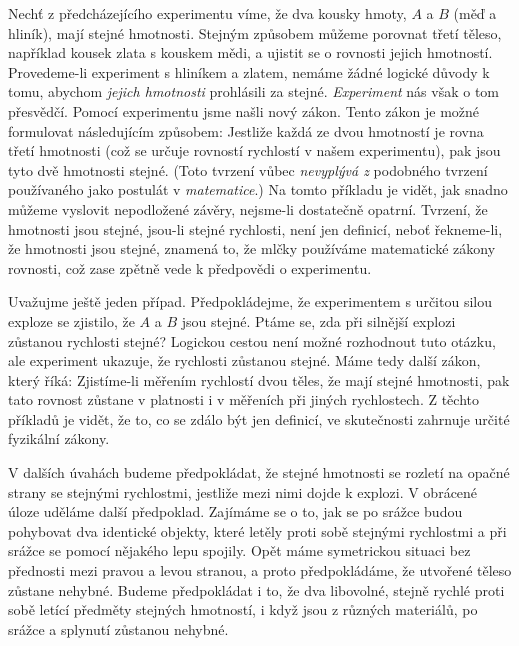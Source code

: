 {    Nechť z předcházejícího experimentu víme, že dva kousky hmoty, \(A\) a \(B\) (měď a hliník), 
    mají stejné hmotnosti. Stejným způsobem můžeme porovnat třetí těleso, například kousek zlata s 
    kouskem mědi, a ujistit se o rovnosti jejich hmotností. Provedeme-li experiment s hliníkem a 
    zlatem, nemáme žádné logické důvody k tomu, abychom \emph{jejich hmotnosti} prohlásili za 
    stejné. \emph{Experiment} nás však o tom přesvědčí. Pomocí experimentu jsme našli nový zákon. 
    Tento zákon je možné formulovat následujícím způsobem: Jestliže každá ze dvou hmotností je 
    rovna třetí hmotnosti (což se určuje rovností rychlostí v našem experimentu), pak jsou tyto dvě 
    hmotnosti stejné. (Toto tvrzení vůbec \emph{nevyplývá z} podobného tvrzení používaného jako 
    postulát v \emph{matematice}.) Na tomto příkladu je vidět, jak snadno můžeme vyslovit 
    nepodložené závěry, nejsme-li dostatečně opatrní. Tvrzení, že hmotnosti jsou stejné, jsou-li 
    stejné rychlosti, není jen definicí, neboť řekneme-li, že hmotnosti jsou stejné, znamená to, že 
    mlčky používáme matematické zákony rovnosti, což zase zpětně vede k předpovědi o experimentu.
    
    Uvažujme ještě jeden případ. Předpokládejme, že experimentem s určitou silou exploze se 
    zjistilo, že \(A\) a \(B\) jsou stejné. Ptáme se, zda při silnější explozi zůstanou rychlosti 
    stejné? Logickou cestou není možné rozhodnout tuto otázku, ale experiment ukazuje, že rychlosti 
    zůstanou stejné. Máme tedy další zákon, který říká: Zjistíme-li měřením rychlostí dvou těles, 
    že mají stejné hmotnosti, pak tato rovnost zůstane v platnosti i v měřeních při jiných 
    rychlostech. Z těchto příkladů je vidět, že to, co se zdálo být jen definicí, ve skutečnosti 
    zahrnuje určité fyzikální zákony.
    
    V dalších úvahách budeme předpokládat, že stejné hmotnosti se rozletí na opačné strany se 
    stejnými rychlostmi, jestliže mezi nimi dojde k explozi. V obrácené úloze uděláme další 
    předpoklad. Zajímáme se o to, jak se po srážce budou pohybovat dva identické objekty, které 
    letěly proti sobě stejnými rychlostmi a při srážce se pomocí nějakého lepu spojily. Opět máme 
    symetrickou situaci bez přednosti mezi pravou a levou stranou, a proto předpokládáme, že 
    utvořené těleso zůstane nehybné. Budeme předpokládat i to, že dva libovolné, stejně rychlé 
    proti sobě letící předměty stejných hmotností, i když jsou z různých materiálů, po srážce a 
    splynutí zůstanou nehybné.
        
}
